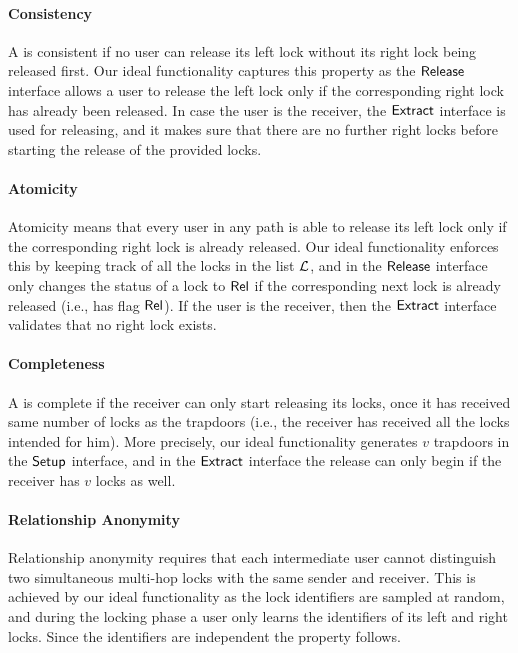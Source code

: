 
\paragraph{Consistency} A \sysname is consistent if no user can release its left lock without its 
right lock being released first. Our ideal functionality captures this property as the $\mathsf{Release}$ 
interface allows a user to release the left lock only if the corresponding right lock has already 
been released. In case the user is the receiver, the $\mathsf{Extract}$ interface is used for releasing, 
and it makes sure that there are no further right locks before starting the release of the 
provided locks.


\paragraph{Atomicity} Atomicity means that every user in any path is able to release its left 
lock only if the corresponding right lock is already released. Our ideal functionality enforces 
this by keeping track of all the locks in the list $\mathcal{L}$, and in the $\mathsf{Release}$ interface only 
changes the status of a lock to $\mathsf{Rel}$ if the corresponding next lock is already released (i.e., 
has flag $\mathsf{Rel}$). If the user is the receiver, then the $\mathsf{Extract}$ interface validates that no 
right lock exists.

\paragraph{Completeness} A \sysname is complete if the receiver can only start releasing its 
locks, once it has received same number of locks as the trapdoors (i.e., the receiver has 
received all the locks intended for him). More precisely, our ideal functionality generates 
$v$ trapdoors in the $\mathsf{Setup}$ interface, and in the $\mathsf{Extract}$ interface the release can only 
begin if the receiver has $v$ locks as well.

\paragraph{Relationship Anonymity} Relationship anonymity requires that each intermediate user 
cannot distinguish two simultaneous multi-hop locks with the same sender and receiver. This is 
achieved by our ideal functionality as the lock identifiers are sampled at random, and during 
the locking phase a user only learns the identifiers of its left and right locks. Since the 
identifiers are independent the property follows.


